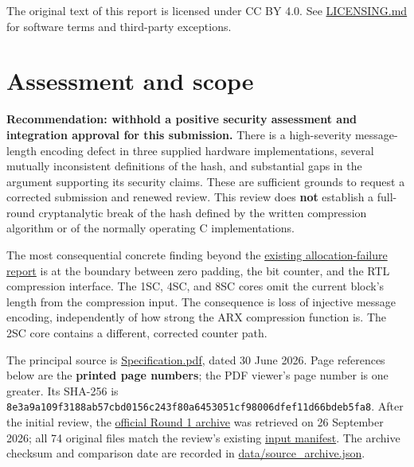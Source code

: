 \documentclass[
  english,
  11pt,
  a4paper,
]{article}
\begin{document}
The original text of this report is licensed under CC BY 4.0. See
\url{LICENSING.md} for software terms and third-party exceptions.

\clearpage

\section{Assessment and scope}\label{assessment-and-scope}

\textbf{Recommendation: withhold a positive security assessment and
integration approval for this submission.} There is a high-severity
message-length encoding defect in three supplied hardware
implementations, several mutually inconsistent definitions of the hash,
and substantial gaps in the argument supporting its security claims.
These are sufficient grounds to request a corrected submission and
renewed review. This review does \textbf{not} establish a full-round
cryptanalytic break of the hash defined by the written compression
algorithm or of the normally operating C implementations.

The most consequential concrete finding beyond the
\href{https://ngcc.dev/reports/hash-10.html}{existing allocation-failure
report} is at the boundary between zero padding, the bit counter, and
the RTL compression interface. The 1SC, 4SC, and 8SC cores omit the
current block's length from the compression input. The consequence is
loss of injective message encoding, independently of how strong the ARX
compression function is. The 2SC core contains a different, corrected
counter path.

The principal source is
\href{data/SOURCES.md\#source-1}{Specification.pdf}, dated 30 June 2026.
Page references below are the \textbf{printed page numbers}; the PDF
viewer's page number is one greater. Its SHA-256 is
\nolinkurl{8e3a9a109f3188ab57cbd0156c243f80a6453051cf98006dfef11d66bdeb5fa8}.
After the initial review, the
\href{https://www.niccs.org.cn/niccs/Proposal/Cryptographic\%20Hash\%20Algorithms/Round\%201\%20candidates/FEILIAN.zip}{official
Round 1 archive} was retrieved on 26 September 2026; all 74 original
files match the review's existing \href{data/input_manifest.json}{input
manifest}. The archive checksum and comparison date are recorded in
\url{data/source_archive.json}.

\end{document}
